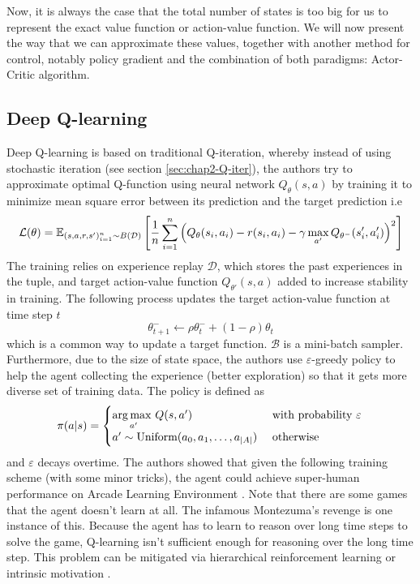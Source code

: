 \label{sec:chap2-deep-rl}
Now, it is always the case that the total number of states is too big for us to represent the exact value function or action-value function. We will now present the way that we can approximate these values, together with another method for control, notably policy gradient and the combination of both paradigms: Actor-Critic algorithm.

\subsection{Deep Q-learning \cite{mnih2015human}}
Deep Q-learning is based on traditional Q-iteration, whereby instead of using stochastic iteration (see section \ref{sec:chap2-Q-iter}), the authors try to approximate optimal Q-function using neural network $Q_\theta(s, a)$ by training it to minimize mean square error between its prediction and the target prediction i.e
\begin{equation}
    \mathcal{L}(\theta) = \mathbb{E}_{(s, a, r, s')^n_{i=1} \sim B(\mathcal{D})}\left[  \frac{1}{n}\sum^n_{i=1} \left( Q_{\theta}(s_i, a_i) - r(s_i, a_i) - \gamma\max_{a'} Q_{\theta^-}(s'_i, a'_i) \right)^2  \right]
\end{equation}
The training relies on experience replay $\mathcal{D}$, which stores the past experiences in the tuple, and target action-value function $Q_{\theta'}(s, a)$ added to increase stability in training. The following process updates the target action-value function at time step $t$
\begin{equation}
\label{eqn:chap2-update-target}
    \theta^-_{t+1} \leftarrow \rho \theta^-_t + (1-\rho) \theta_t
\end{equation}
which is a common way to update a target function. $\mathcal{B}$ is a mini-batch sampler. Furthermore, due to the size of state space, the authors use $\varepsilon$-greedy policy to help the agent collecting the experience (better exploration) so that it gets more diverse set of training data. The policy is defined as
\begin{equation}
    \pi(a | s) = \begin{cases}
        \underset{a'}{\arg\max \ } Q(s, a') &\text{ with probability } \varepsilon \\
        a' \sim \text{Uniform}(a_0, a_1, \dots, a_{|A|}) &\text{ otherwise } \\
    \end{cases} \\
\end{equation}
and $\varepsilon$ decays overtime. The authors showed that given the following training scheme (with some minor tricks), the agent could achieve super-human performance on Arcade Learning Environment \cite{bellemare2013arcade}. Note that there are some games that the agent doesn't learn at all. The infamous Montezuma's revenge is one instance of this. Because the agent has to learn to reason over long time steps to solve the game, Q-learning isn't sufficient enough for reasoning over the long time step. This problem can be mitigated via hierarchical reinforcement learning \cite{kulkarni2016hierarchical, dayan1993feudal, vezhnevets2017feudal} or intrinsic motivation \cite{pathak2017curiosity}. 

